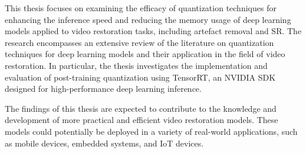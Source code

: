 This thesis focuses on examining the efficacy of quantization techniques for enhancing the inference speed and reducing the memory usage of deep learning models applied to video restoration tasks, including artefact removal and SR. The research encompasses an extensive review of the literature on quantization techniques for deep learning models and their application in the field of video restoration. In particular, the thesis investigates the implementation and evaluation of post-training quantization using TensorRT, an NVIDIA SDK designed for high-performance deep learning inference.

The findings of this thesis are expected to contribute to the knowledge and development of more practical and efficient video restoration models. These models could potentially be deployed in a variety of real-world applications, such as mobile devices, embedded systems, and IoT devices.
